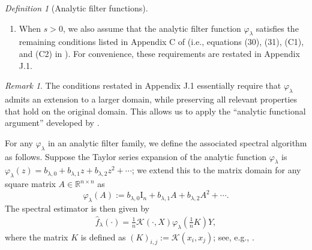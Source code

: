 \documentclass{article}
\theoremstyle{plain}
\theoremstyle{definition}
\newtheorem{assumption}{Assumption} %
\theoremstyle{remark}
\newtheorem{definition}[theorem]{Definition}
\newtheorem{remark}[theorem]{Remark}
\newcommand{\reg}{\varphi_\lambda}
\newcommand{\dhnote}[1]{{\color{red}[#1]} } %
\begin{document}
\begin{definition}[Analytic filter functions]
\begin{enumerate}
    \item 
    
    When $s>0$, we also assume that the analytic filter function $\reg$ satisfies the remaining conditions listed in Appendix C of \cite{lu2024saturation} (i.e., equations (30), (31), (C1), and (C2) in \cite{lu2024saturation}). For convenience, these requirements are restated in Appendix J.1.
    
        
  \end{enumerate}
  \end{definition}


\begin{remark}
    The conditions restated in Appendix J.1 essentially require that $\reg$ admits an extension to a larger domain, while preserving all relevant properties that hold on the original domain. This allows us to apply the ``analytic functional argument'' developed by \cite{li2024generalization}.
\end{remark}

For any $\reg$ in an analytic filter family, we define the associated spectral algorithm as follows. 
Suppose the Taylor series expansion of the analytic function $\reg$ is $\reg(z)= b_{\lambda, 0} + b_{\lambda, 1} z + b_{\lambda, 2} z^2 + \cdots$; 
we extend this to the matrix domain for any square matrix $A \in \mathbb{R}^{n \times n}$ as 
\begin{equation}\label{eqn_def_filter_matrix_function}
    \reg(A) := b_{\lambda, 0} \mathrm{I}_{n} + b_{\lambda, 1} A + b_{\lambda, 2} A^2 + \cdots. 
\end{equation}
The spectral estimator is then given by 
\begin{align}
  \label{eq:SA}
  \hat{f}_{\lambda}(\cdot) = \frac{1}{n}\mathscr{K}(\cdot, X) \reg\left(\frac{1}{n}K\right) Y,
\end{align}
where the matrix $K$ is defined as $(K)_{i, j} := \mathscr{K}(x_i, x_j)$; see, e.g., \cite{bauer2007_RegularizationAlgorithms, li2024generalization}. 
\end{document}
